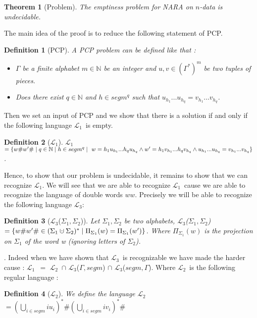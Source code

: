 \documentclass[a4paper,10pt]{report}
\newtheorem{thr}{Theorem} %
\newtheorem{df}{Definition}
\newcommand{\Lu}{$\mathcal{L}_{1}$}
\newcommand{\Ld}{$\mathcal{L}_{2}$}
\newcommand{\Lt}{$\mathcal{L}_{3}$}
\newcommand{\sm}{segm}
\newcommand{\cupdot}{\mathbin{\mathaccent\cdot\cup}}
\begin{document}
\begin{thr}[Problem]
    The emptiness problem for \textit{NARA} on $n$-data is undecidable.
\end{thr}
The main idea of the proof is to reduce the following statement of PCP. 
 \begin{df}[PCP] A PCP problem can be defined like that :
    \begin{itemize}
     \item[Input:] $\Gamma$ be a finite alphabet $m \in \mathbb N$ be an integer and $u,v \in {(\Gamma^*)}^m$ be two tuples of pieces.
     \item[Question:] Does there exist $q \in \mathbb N$ and $h \in \sm ^ q$ such that $u_{h_1}...u_{h_q}  = v_{h_1}...v_{h_q}$.
    \end{itemize}
  \end{df}
  Then we set an input of PCP and we show that there is a solution if and only if the following language \Lu\ is empty.
  \begin{df}[\Lu] 
    \Lu $= \{w\#w'\#   \mid    
     q \in \mathbb N 
    \mid h \in \sm ^ q \mid \\\
     w = h_1u_{h_1}...h_qu_{h_q}  
    \wedge w' = h_1v_{h_1}...h_qv_{h_q}
    \wedge u_{h_1}...u_{h_q}  = v_{h_1}...v_{h_q}
    \}$.	
  \end{df}
  Hence, to show that our problem is undecidable, it remains to show that we can recognize \Lu.
  We will see that we are able to recognize \Lu\ cause we are able to recognize the language of double words $ww$.
  Precisely we will be able to recognize the following language \Lt:
  \begin{df}[\Lt($\Sigma_1,\Sigma_2$)]
    Let $\Sigma_1,\Sigma_2$ be two alphabets, 
    \Lt($\Sigma_1,\Sigma_2$) $= \{w\#w'\# \in (\Sigma_1 \cupdot \Sigma_2)^* \mid \Pi_{\Sigma_1}(w) = \Pi_{\Sigma_1}(w')\}$.
    Where $\Pi_{\Sigma_1}(w)$ is the projection on $\Sigma_1$ of the word w (ignoring letters of $\Sigma_2$).
  \end{df}.
  Indeed when we have shown that \Lt\ is recognizable we have made the harder cause : \Lu\ $=$ \Ld\ $\cap$ \Lt($\Gamma,\sm$) $\cap$ \Lt($\sm,\Gamma$).
  Where \Ld\ is the following regular language : 
  \begin{df}[\Ld]
    We define the language \Ld $= \left(\bigcup\limits_{i\in \sm} iu_i\right)^* \# \left(\bigcup\limits_{i\in \sm} iv_i\right)^* \# $
  \end{df}
\end{document}
